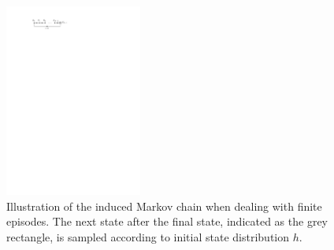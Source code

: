 \documentclass[a4paper]{report}
\theoremstyle{definition}
\theoremstyle{plain}
\begin{document}
\begin{figure}[h]
  \centering
  \includegraphics[width=0.4\textwidth]{figures/episodic_markov_chain.pdf}
  \caption{Illustration of the induced Markov chain when dealing with finite
    episodes. The next state after the final state, indicated as the grey
    rectangle, is sampled according to initial state distribution $h$.}
  \label{fig:episodic_MC}
\end{figure}
\end{document}
